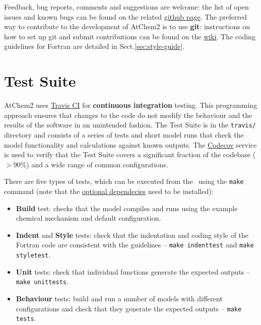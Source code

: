 Feedback, bug reports, comments and suggestions are welcome: the list
of open issues and known bugs can be found on the related
\href{https://github.com/AtChem/AtChem2/issues}{github page}. The
preferred way to contribute to the development of AtChem2 is to use
\textbf{git}: instructions on how to set up git and submit
contributions can be found on the
\href{https://github.com/AtChem/AtChem2/wiki/How-to-contribute}{wiki}.
The coding guidelines for Fortran are detailed in Sect.\ref{sec:style-guide}.

\section{Test Suite} \label{sec:test-suite}

AtChem2 uses \href{https://travis-ci.org/}{Travis CI} for
\textbf{continuous integration} testing. This programming approach
ensures that changes to the code do not modify the behaviour and the
results of the software in an unintended fashion. The Test Suite is in
the \texttt{travis/} directory and consists of a series of tests and
short model runs that check the model functionality and calculations
against known outputs. The \href{https://codecov.io/}{Codecov} service
is used to verify that the Test Suite covers a significant fraction of
the codebase ($>$90\%) and a wide range of common configurations.

There are five types of tests, which can be executed from the
\maindir\ using the \verb|make| command (note that the
\hyperref[subsec:optional-dependencies]{optional dependecies} need to
be installed):

\begin{itemize}
\item \textbf{Build} test: checks that the model compiles and runs
  using the example chemical mechanism and default configuration.
\item \textbf{Indent} and \textbf{Style} tests: check that the
  indentation and coding style of the Fortran code are consistent with
  the guidelines -- \verb|make indenttest| and \verb|make styletest|.
\item \textbf{Unit} tests: check that individual functions generate
  the expected outputs -- \verb|make unittests|.
\item \textbf{Behaviour} tests: build and run a number of models with
  different configurations and check that they generate the expected
  outputs -- \verb|make tests|.
\end{itemize}

